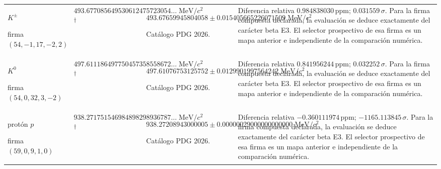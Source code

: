 \begin{longtable}{@{}>{\raggedright\arraybackslash}p{}>{\raggedright\arraybackslash}p{}>{\raggedright\arraybackslash}p{}>{\raggedright\arraybackslash}p{}@{}}
$K^\pm$\par firma $(54,\allowbreak -1,\allowbreak 17,\allowbreak -2,\allowbreak 2)$ & $493.677085\allowbreak{}649530\allowbreak{}612475\allowbreak{}723054\ldots\;\mathrm{MeV}/c^2$\textsuperscript{\(\dagger\)} & $493.676599\allowbreak{}458040\allowbreak{}58\pm 0.015405\allowbreak{}665226\allowbreak{}071509\;\mathrm{MeV}/c^2$\par\footnotesize Catálogo PDG 2026. & Diferencia relativa $0.984838\allowbreak{}030\,\mathrm{ppm}$; $0.031559\,\sigma$. Para la firma compuesta declarada, la evaluación se deduce exactamente del carácter beta E3. El selector prospectivo de esa firma es un mapa anterior e independiente de la comparación numérica. \\
$K^0$\par firma $(54,\allowbreak 0,\allowbreak 32,\allowbreak 3,\allowbreak -2)$ & $497.611186\allowbreak{}497750\allowbreak{}457358\allowbreak{}558672\ldots\;\mathrm{MeV}/c^2$\textsuperscript{\(\dagger\)} & $497.610767\allowbreak{}531257\allowbreak{}52\pm 0.012990\allowbreak{}199756\allowbreak{}4242\;\mathrm{MeV}/c^2$\par\footnotesize Catálogo PDG 2026. & Diferencia relativa $0.841956\allowbreak{}244\,\mathrm{ppm}$; $0.032252\,\sigma$. Para la firma compuesta declarada, la evaluación se deduce exactamente del carácter beta E3. El selector prospectivo de esa firma es un mapa anterior e independiente de la comparación numérica. \\
protón $p$\par firma $(59,\allowbreak 0,\allowbreak 9,\allowbreak 1,\allowbreak 0)$ & $938.271751\allowbreak{}546984\allowbreak{}898298\allowbreak{}936787\ldots\;\mathrm{MeV}/c^2$\textsuperscript{\(\dagger\)} & $938.272089\allowbreak{}430000\allowbreak{}05\pm 0.000000\allowbreak{}290000\allowbreak{}000000\allowbreak{}00\;\mathrm{MeV}/c^2$\par\footnotesize Catálogo PDG 2026. & Diferencia relativa $-0.360111\allowbreak{}974\,\mathrm{ppm}$; $-1165.113845\,\sigma$. Para la firma compuesta declarada, la evaluación se deduce exactamente del carácter beta E3. El selector prospectivo de esa firma es un mapa anterior e independiente de la comparación numérica. \\

\end{longtable}
